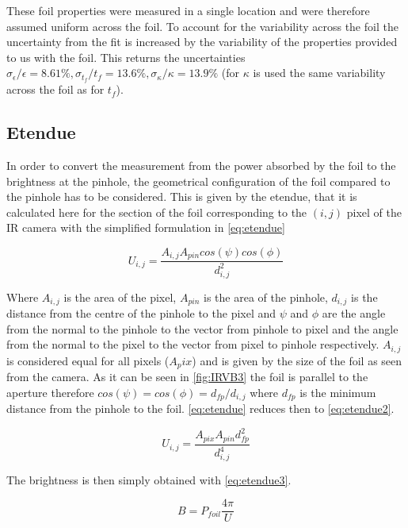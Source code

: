 These foil properties were measured in a single location and were therefore assumed uniform across the foil. To account for the variability across the foil the uncertainty from the fit is increased by the variability of the properties provided to us with the foil. This returns the uncertainties ${\sigma_{\epsilon}/\epsilon=8.61\%}, {\sigma_{t_f}/t_f=13.6\%}, {\sigma_{\kappa}/\kappa=13.9\%}$ (for $\kappa$ is used the same variability across the foil as for $t_f$).

\subsection{Etendue}\label{Etendue}
In order to convert the measurement from the power absorbed by the foil to the brightness at the pinhole, the geometrical configuration of the foil compared to the pinhole has to be considered. This is given by the etendue, that it is calculated here for the section of the foil corresponding to the $(i,j)$ pixel of the IR camera with the simplified formulation in \autoref{eq:etendue} \cite{Reinke2011,Carr2018}

\begin{equation}
U_{i,j} = \frac{A_{i,j} A_{pin} cos(\psi) cos(\phi)}{d_{i,j}^2}
\label{eq:etendue}
\end{equation}

Where $A_{i,j}$ is the area of the pixel, $A_{pin}$ is the area of the pinhole, $d_{i,j}$ is the distance from the centre of the pinhole to the pixel and $\psi$ and $\phi$ are the angle from the normal to the pinhole to the vector from pinhole to pixel and the angle from the normal to the pixel to the vector from pixel to pinhole respectively. $A_{i,j}$ is considered equal for all pixels ($A_pix$) and is given by the size of the foil as seen from the camera. As it can be seen in \autoref{fig:IRVB3} the foil is parallel to the aperture therefore $cos(\psi) = cos(\phi) = d_{fp}/d_{i,j}$ where $d_{fp}$ is the minimum distance from the pinhole to the foil. \autoref{eq:etendue} reduces then to \autoref{eq:etendue2}.

\begin{equation}
U_{i,j} = \frac{A_{pix} A_{pin} d_{fp}^2}{d_{i,j}^4}
\label{eq:etendue2}
\end{equation}

The brightness is then simply obtained with \autoref{eq:etendue3}.

\begin{equation}
B = P_{foil}\frac{4\pi}{U}
\label{eq:etendue3}
\end{equation}



